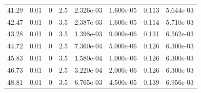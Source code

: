 \documentclass[preview]{standalone}
\begin{document}
{{\begin{tabular}{L{1.2cm}C{1.2cm} C{0.3cm}C{0.5cm} C{1.4cm}C{1.4cm} C{1.4cm}C{1.4cm}}
  41.29  &  0.01  & 0     & 2.5 &  2.326e-03  & 1.600e-05  & 0.113 &  5.644e-03   \\ 
  42.47  &  0.01  & 0     & 3.5 &  2.387e-03  & 1.600e-05  & 0.114 &  5.710e-03   \\ 
  43.28  &  0.01  & 0     & 3.5 &  1.398e-03  & 9.000e-06  & 0.131 &  6.562e-03   \\ 
  44.72  &  0.01  & 0     & 2.5 &  7.360e-04  & 5.000e-06  & 0.126 &  6.300e-03   \\ 
  45.83  &  0.01  & 0     & 3.5 &  1.580e-04  & 1.000e-06  & 0.126 &  6.300e-03   \\ 
  46.73  &  0.01  & 0     & 2.5 &  3.220e-04  & 2.000e-06  & 0.126 &  6.300e-03   \\ 
  48.81  &  0.01  & 0     & 3.5 &  6.765e-03  & 4.500e-05  & 0.139 &  6.956e-03   \\ 
\hline 
\end{tabular} 

}}
\end{document}
